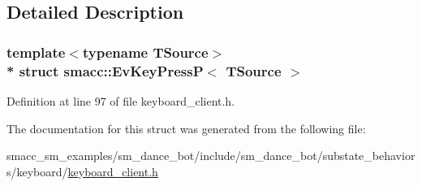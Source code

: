 \subsection{Detailed Description}
\subsubsection*{template$<$typename T\+Source$>$\\*
struct smacc\+::\+Ev\+Key\+Press\+P$<$ T\+Source $>$}



Definition at line 97 of file keyboard\+\_\+client.\+h.



The documentation for this struct was generated from the following file\+:\begin{DoxyCompactItemize}
\item 
smacc\+\_\+sm\+\_\+examples/sm\+\_\+dance\+\_\+bot/include/sm\+\_\+dance\+\_\+bot/substate\+\_\+behaviors/keyboard/\hyperlink{keyboard__client_8h}{keyboard\+\_\+client.\+h}\end{DoxyCompactItemize}
